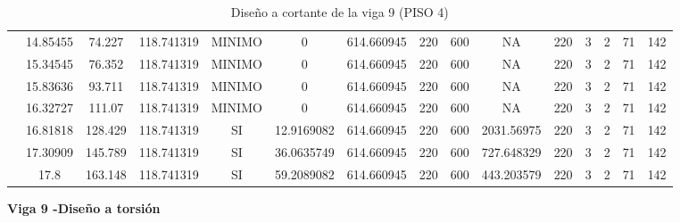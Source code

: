\begin{table}[H]
{\begin{tabular}{|c|c|c|c|c|c|c|c|c|c|c|c|c|c|c|}
\cline{2-15}    & 14.85455 & 74.227 & 118.741319 & MINIMO & 0   & 614.660945 & 220 & 600 & NA  & 220 & 3   & 2   & 71  & 142 \bigstrut\\
\cline{2-15}    & 15.34545 & 76.352 & 118.741319 & MINIMO & 0   & 614.660945 & 220 & 600 & NA  & 220 & 3   & 2   & 71  & 142 \bigstrut\\
\cline{2-15}    & 15.83636 & 93.711 & 118.741319 & MINIMO & 0   & 614.660945 & 220 & 600 & NA  & 220 & 3   & 2   & 71  & 142 \bigstrut\\
\cline{2-15}    & 16.32727 & 111.07 & 118.741319 & MINIMO & 0   & 614.660945 & 220 & 600 & NA  & 220 & 3   & 2   & 71  & 142 \bigstrut\\
\cline{2-15}    & 16.81818 & 128.429 & 118.741319 & SI  & 12.9169082 & 614.660945 & 220 & 600 & 2031.56975 & 220 & 3   & 2   & 71  & 142 \bigstrut\\
\cline{2-15}    & 17.30909 & 145.789 & 118.741319 & SI  & 36.0635749 & 614.660945 & 220 & 600 & 727.648329 & 220 & 3   & 2   & 71  & 142 \bigstrut\\
\cline{2-15}    & 17.8 & 163.148 & 118.741319 & SI  & 59.2089082 & 614.660945 & 220 & 600 & 443.203579 & 220 & 3   & 2   & 71  & 142 \bigstrut\\
\hline
\end{tabular}%

  
 
  }%
    \caption{Diseño a cortante de la viga 9 (PISO 4) }
  \label{tab:C VG9 P4 }%
\end{table}%
\newpage
\textbf{Viga 9 -Diseño a torsión}
